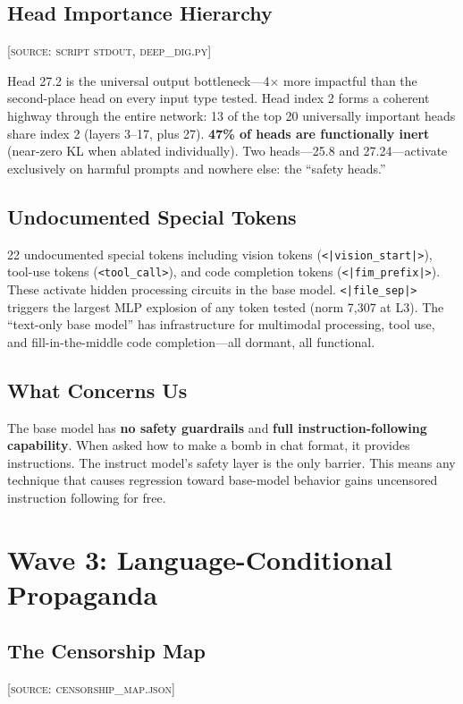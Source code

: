 \documentclass[11pt,a4paper]{article}
\begin{document}
\subsection{Head Importance Hierarchy}
\textsc{[source: script stdout, deep\_dig.py]}

Head 27.2 is the universal output bottleneck---4$\times$ more impactful than the second-place head on every input type tested. Head index 2 forms a coherent highway through the entire network: 13 of the top 20 universally important heads share index 2 (layers 3--17, plus 27). \textbf{47\% of heads are functionally inert} (near-zero KL when ablated individually). Two heads---25.8 and 27.24---activate exclusively on harmful prompts and nowhere else: the ``safety heads.''

\subsection{Undocumented Special Tokens}
22 undocumented special tokens including vision tokens (\texttt{<|vision\_start|>}), tool-use tokens (\texttt{<tool\_call>}), and code completion tokens (\texttt{<|fim\_prefix|>}). These activate hidden processing circuits in the base model. \texttt{<|file\_sep|>} triggers the largest MLP explosion of any token tested (norm 7,307 at L3). The ``text-only base model'' has infrastructure for multimodal processing, tool use, and fill-in-the-middle code completion---all dormant, all functional.

\subsection{What Concerns Us}
The base model has \textbf{no safety guardrails} and \textbf{full instruction-following capability}. When asked how to make a bomb in chat format, it provides instructions. The instruct model's safety layer is the only barrier. This means any technique that causes regression toward base-model behavior gains uncensored instruction following for free.

\section{Wave 3: Language-Conditional Propaganda}

\subsection{The Censorship Map}
\textsc{[source: censorship\_map.json]}
\end{document}
